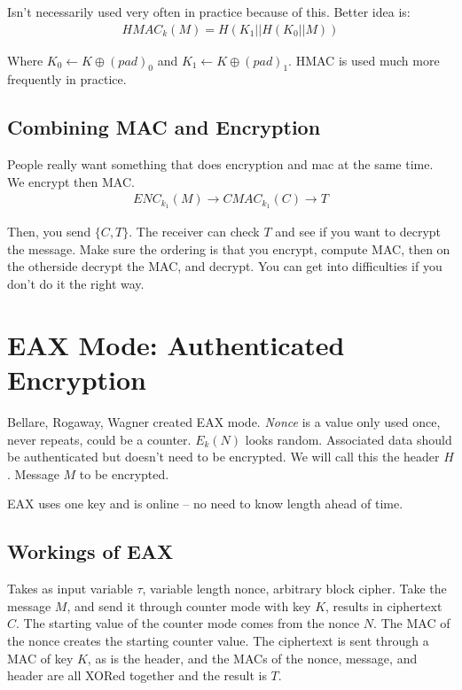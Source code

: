 \documentclass[psamsfonts]{amsart}
\begin{document}
Isn't necessarily used very often in practice because of this. Better idea is:
\begin{eqnarray}
  HMAC_{k}(M) = H(K_1 || H(K_0 || M))
\end{eqnarray}

Where $K_0 \leftarrow K \oplus (pad)_0$ and $K_1 \leftarrow K \oplus (pad)_1$. HMAC is used much more frequently in practice.

\subsection{Combining MAC and Encryption}

People really want something that does encryption and mac at the same time. We encrypt then MAC.
\begin{eqnarray}
  ENC_{k_1}(M) \rightarrow C
  MAC_{k_1}(C) \rightarrow T
\end{eqnarray}

Then, you send $\{C, T\}$. The receiver can check $T$ and see if you want to decrypt the message. Make sure the ordering is that you encrypt, compute MAC, then on the otherside decrypt the MAC, and decrypt. You can get into difficulties if you don't do it the right way. 

\section{EAX Mode: Authenticated Encryption}

Bellare, Rogaway, Wagner created EAX mode. \emph{Nonce} is a value only used once, never repeats, could be a counter. $E_{k}(N)$ looks random. Associated data should be authenticated but doesn't need to be encrypted. We will call this the header $H$. Message $M$ to be encrypted.

EAX uses one key and is online -- no need to know length ahead of time. 

\subsection{Workings of EAX}

Takes as input variable $\tau$, variable length nonce, arbitrary block cipher. Take the message $M$, and send it through counter mode with key $K$, results in ciphertext $C$. The starting value of the counter mode comes from the nonce $N$. The MAC of the nonce creates the starting counter value. The ciphertext is sent through a MAC of key $K$, as is the header, and the MACs of the nonce, message, and header are all XORed together and the result is $T$. 
\end{document}
